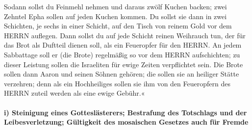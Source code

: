 Sodann sollst du Feinmehl nehmen und daraus zwölf Kuchen
backen; zwei Zehntel Epha sollen auf jeden Kuchen kommen.
Du sollst sie dann in zwei Schichten, je sechs in einer
Schicht, auf den Tisch von reinem Gold vor dem HERRN auflegen.
Dann sollst du auf jede Schicht reinen Weihrauch tun, der
für das Brot als Duftteil dienen soll, als ein Feueropfer für den HERRN.
An jedem Sabbattage soll er (die Brote) regelmäßig so vor
dem HERRN aufschichten; zu dieser Leistung sollen die Israeliten für
ewige Zeiten verpflichtet sein. Die Brote sollen dann
Aaron und seinen Söhnen gehören; die sollen sie an heiliger Stätte
verzehren; denn als ein Hochheiliges sollen sie ihm von den Feueropfern
des HERRN zuteil werden als eine ewige Gebühr.«

\hypertarget{i-steinigung-eines-gottesluxe4sterers-bestrafung-des-totschlags-und-der-leibesverletzung-guxfcltigkeit-des-mosaischen-gesetzes-auch-fuxfcr-fremde}{%
\paragraph{i) Steinigung eines Gotteslästerers; Bestrafung des
Totschlags und der Leibesverletzung; Gültigkeit des mosaischen Gesetzes
auch für
Fremde}\label{i-steinigung-eines-gottesluxe4sterers-bestrafung-des-totschlags-und-der-leibesverletzung-guxfcltigkeit-des-mosaischen-gesetzes-auch-fuxfcr-fremde}}


